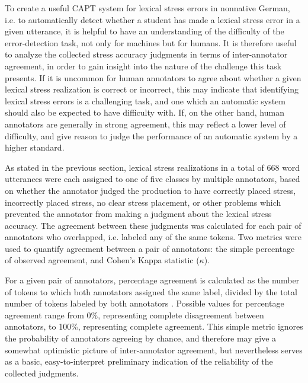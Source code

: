 	To create a useful CAPT system for lexical stress errors in nonnative German, i.e. to automatically detect whether a student has made a lexical stress error in a given utterance, it is helpful to have an understanding of the difficulty of the error-detection task, not only for machines but for humans. It is therefore useful to analyze the collected stress accuracy judgments in terms of inter-annotator agreement, in order to gain insight into the nature of the challenge this task presents. If it is uncommon for human annotators to agree about whether a given lexical stress realization is correct or incorrect, this may indicate that  identifying lexical stress errors is a challenging task, and one which an automatic system should also be expected to have difficulty with. If, on the other hand, human annotators are generally in strong agreement, this may reflect a lower level of difficulty, and give reason to judge the performance of an automatic system by a higher standard.  
	
	As stated in the previous section,
	lexical stress realizations in a total of 
	668 word utterances were each assigned to one of five classes by multiple annotators, based on whether the annotator judged the production to have correctly placed stress, incorrectly placed stress, no clear stress placement, or other problems which prevented the annotator from making a judgment about the lexical stress accuracy. The agreement between these judgments was calculated for each pair of annotators who overlapped, i.e. labeled any of the same tokens. 
		Two metrics were used to quantify agreement between a pair of annotators: the simple percentage of observed agreement, and Cohen's Kappa statistic ($\kappa$). 
		
		For a given pair of annotators, percentage agreement is calculated as the number of tokens to which both annotators assigned the same label, divided by the total number of tokens labeled by both annotators . Possible values for percentage agreement range from 0\%, representing complete disagreement between annotators, to 100\%, representing complete agreement. This simple metric ignores the probability of annotators agreeing by chance, and therefore may give a somewhat optimistic picture of inter-annotator agreement, but nevertheless serves as a basic, easy-to-interpret preliminary indication of the reliability of the collected judgments.
		
